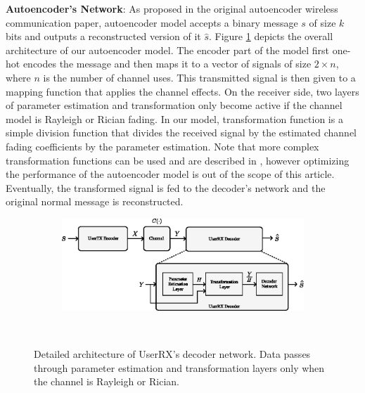 \textbf{Autoencoder's Network}: As proposed in the original autoencoder wireless communication paper, autoencoder model accepts a binary message \(s\) of size \(k\) bits and outputs a reconstructed version of it \(\hat{s}\). Figure \ref{fig:autoencoder_architecture} depicts the overall architecture of our autoencoder model. The encoder part of the model first one-hot encodes the message and then maps it to a vector of signals of size \(2 \times n\), where \(n\) is the number of channel uses. This transmitted signal is then given to a mapping function that applies the channel effects. On the receiver side, two layers of parameter estimation and transformation only become active if the channel model is Rayleigh or Rician fading. In our model, transformation function is a simple division function that divides the received signal by the estimated channel fading coefficients by the parameter estimation. Note that more complex transformation functions can be used and are described in \cite{o2017introduction}, however optimizing the performance of the autoencoder model is out of the scope of this article. Eventually, the transformed signal is fed to the decoder's network and the original normal message is reconstructed. 

\begin{figure}[tp!]
	\center
	\begin{subfigure}{0.5\textwidth}
		\includegraphics[width=\linewidth]{figs/autoencoder_architecture}
	\end{subfigure}
	\\
	\caption{Detailed architecture of UserRX's decoder network. Data passes through parameter estimation and transformation layers only when the channel is Rayleigh or Rician.}	
	\label{fig:autoencoder_architecture}
\end{figure}


